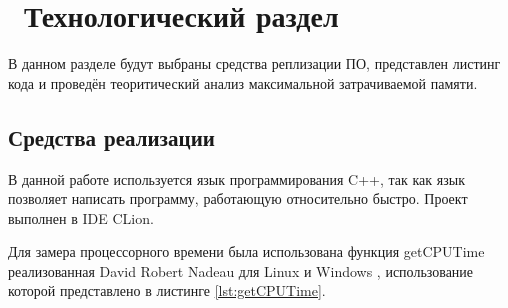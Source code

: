\chapter{ Технологический раздел}
\label{cha:technological}

    В данном разделе будут выбраны средства реплизации ПО, представлен листинг кода
    и проведён теоритический анализ максимальной затрачиваемой памяти. 

    \section{Средства реализации}
        В данной работе используется язык программирования C++, так как
        язык позволяет написать программу, работающую относительно быстро. 
        Проект выполнен в IDE CLion.

        Для замера процессорного времени была использована функция getCPUTime
        реализованная David Robert Nadeau для Linux и Windows , использование которой представлено в листинге \ref{lst:getCPUTime}.

